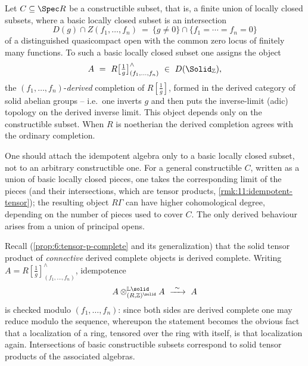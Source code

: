 \begin{definition}
\label{def:11:constructible-idempotent}
Let $C\subseteq\Spec R$ be a constructible subset, that is, a finite union of
locally closed subsets, where a basic locally closed subset is an intersection
\begin{equation*}
D(g)\cap Z(f_{1},\dots,f_{n})\ =\ \{g\neq 0\}\cap\{f_{1}=\cdots=f_{n}=0\}
\end{equation*}
of a distinguished quasicompact open with the common zero locus of finitely many
functions. To such a basic locally closed subset one assigns the object
\begin{equation*}
A\ =\ R\bigl[\tfrac1g\bigr]^{\wedge}_{(f_{1},\dots,f_{n})}\ \in\ D(\Solid_{
\mathbb{Z}}),
\end{equation*}
the $(f_{1},\dots,f_{n})$-\emph{derived} completion of $R[\tfrac1g]$, formed in
the derived category of solid abelian groups -- i.e.\ one inverts $g$ and then
puts the inverse-limit (adic) topology on the derived inverse limit. This object
depends only on the constructible subset. When $R$ is noetherian the derived
completion agrees with the ordinary completion.
\end{definition}

\begin{remark}
\label{rmk:11:only-locally-closed}
One should attach the idempotent algebra only to a basic locally closed subset,
not to an arbitrary constructible one. For a general constructible $C$, written
as a union of basic locally closed pieces, one takes the corresponding limit of
the pieces (and their intersections, which are tensor products,
\cref{rmk:11:idempotent-tensor}); the resulting object $R\Gamma$ can have higher
cohomological degree, depending on the number of pieces used to cover $C$. The
only derived behaviour arises from a union of principal opens.
\end{remark}

\begin{remark}[Idempotence]
\label{rmk:11:idempotent-tensor}
Recall (\cref{prop:6:tensor-p-complete} and its generalization) that the solid
tensor product of \emph{connective} derived complete objects is derived complete. Writing
$A=R[\tfrac1g]^{\wedge}_{(f_{1},\dots,f_{n})}$, idempotence
\begin{equation*}
A\otimes^{\mathbb{L}\solid}_{(R,\mathbb{Z})^{\solid}}A\ \xrightarrow{\ \sim\ }\ A
\end{equation*}
is checked modulo $(f_{1},\dots,f_{n})$: since both sides are derived complete
one may reduce modulo the sequence, whereupon the statement becomes the obvious
fact that a localization of a ring, tensored over the ring with itself, is that
localization again. Intersections of basic constructible subsets correspond to
solid tensor products of the associated algebras.
\end{remark}

